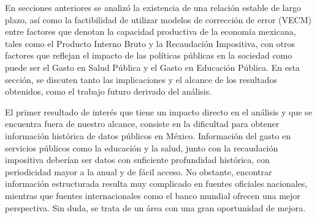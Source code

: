 


En secciones anteriores se analizó la existencia de una relación estable de largo plazo, así como la factibilidad de utilizar modelos de corrección de error (VECM) entre factores que denotan la capacidad productiva de la economía mexicana, tales como el Producto Interno Bruto y la Recaudación Impositiva, con otros factores que reflejan el impacto de las políticas públicas en la sociedad como puede ser el Gasto en Salud Pública y el Gasto en Educación Pública.  En esta sección, se discuten tanto las implicaciones y el alcance de los resultados obtenidos, como el trabajo futuro derivado del análisis.  \bigskip

El primer resultado de interés que tiene un impacto directo en el análisis y que se encuentra fuera de nuestro alcance, consiste en la dificultad para obtener información histórica de datos públicos en México. Información del gasto en servicios públicos como la educación y la salud, junto con la recaudación impositiva deberían ser datos con suficiente profundidad histórica, con periodicidad mayor a la anual y de fácil acceso. No obstante, encontrar información estructurada resulta muy complicado en fuentes oficiales nacionales, mientras que fuentes internacionales como el banco mundial ofrecen una mejor perspectiva. Sin duda, se trata de un área con una gran oportunidad de mejora.\bigskip

